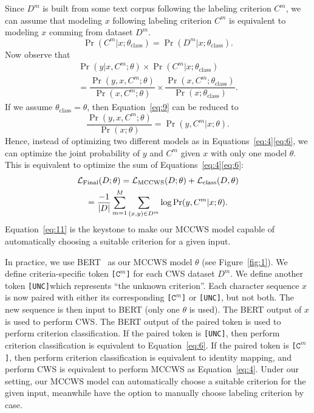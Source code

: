 \documentclass[11pt]{article}
\newcommand{\loss}{\mathcal{L}}
\newcommand{\UNC}{\texttt{[UNC]}}
\newcommand{\Ck}[1]{\texttt{[\(\mathtt{C}^{#1}\)]}}
\newcommand{\opClass}{\operatorname{class}}
\newcommand{\opMCCWS}{\operatorname{MCCWS}}
\newcommand{\opFinal}{\operatorname{Final}}
\newcommand{\thetaC}{\theta_{\opClass}}
\DeclarePairedDelimiter{\abs}{\lvert}{\rvert}
\begin{document}
Since \(D^m\) is built from some text corpus following the labeling criterion \(C^m\), we can assume that modeling \(x\) following labeling criterion \(C^m\) is equivalent to modeling \(x\) comming from dataset \(D^m\).
\begin{equation}\label{eq:8}
  \Pr(C^m | x ; \thetaC) = \Pr(D^m | x ; \thetaC).
\end{equation}
Now observe that
\begin{multline}\label{eq:9}
  \Pr(y | x, C^m ; \theta) \times \Pr(C^m | x ; \thetaC)                                                                              \\
  = \dfrac{\Pr(y, x, C^m ; \theta)}{\Pr(x, C^m ; \theta)} \times \dfrac{\Pr(x, C^m ; \thetaC)}{\Pr(x ; \thetaC)}.
\end{multline}
If we assume \(\thetaC = \theta\), then Equation~\eqref{eq:9} can be reduced to
\begin{equation}\label{eq:10}
  \dfrac{\Pr(y, x, C^m ; \theta)}{\Pr(x ; \theta)} = \Pr(y, C^m | x ; \theta).
\end{equation}
Hence, instead of optimizing two different models as in Equations~\eqref{eq:4}\eqref{eq:6}, we can optimize the joint probability of \(y\) and \(C^m\) given \(x\) with only one model \(\theta\).
This is equivalent to optimize the sum of Equations~\eqref{eq:4}\eqref{eq:6}:
\begin{multline}\label{eq:11}
  \loss_{\opFinal}(D ; \theta) = \loss_{\opMCCWS}(D ; \theta) + \loss_{\opClass}(D, \theta) \\
  = \dfrac{-1}{\abs{D}} \sum_{m = 1}^M \sum_{(x, y) \in D^m} \log \Pr(y, C^m | x ; \theta).
\end{multline}
Equation~\eqref{eq:11} is the keystone to make our MCCWS model capable of automatically choosing a suitable criterion for a given input.

In practice, we use BERT~\citep{devlin-etal-2019-bert} as our MCCWS model \(\theta\) (see Figure~\ref{fig:1}).
We define criteria-specific token \Ck{m} for each CWS dataset \(D^m\).
We define another token \UNC which represents ``the unknown criterion''.
Each character sequence \(x\) is now paired with either its corresponding \Ck{m} or \UNC, but not both.
The new sequence is then input to BERT (only one \(\theta\) is used).
The BERT output of \(x\) is used to perform CWS.
The BERT output of the paired token is used to perform criterion classification.
If the paired token is \UNC, then perform criterion classification is equivalent to Equation~\eqref{eq:6}.
If the paired token is \Ck{m}, then perform criterion classification is equivalent to identity mapping, and perform CWS is equivalent to perform MCCWS as Equation~\eqref{eq:4}.
Under our setting, our MCCWS model can automatically choose a suitable criterion for the given input, meanwhile have the option to manually choose labeling criterion by case.
\end{document}
